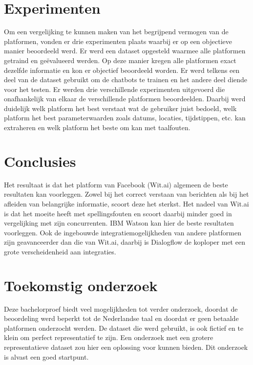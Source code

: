 \documentclass[a0,portrait]{a0poster}
\begin{document}
\begin{multicols}{2}
\color{Black} %
\color{HoGentAccent1} 
\section*{Experimenten}
\color{black}
Om een vergelijking te kunnen maken van het begrijpend vermogen van de platformen,
vonden er drie experimenten plaats waarbij er op een objectieve manier beoordeeld
werd. Er werd een dataset opgesteld waarmee alle platformen getraind en
geëvalueerd werden. Op deze manier kregen alle platformen exact dezelfde informatie
en kon er objectief beoordeeld worden. Er werd telkens een deel van de dataset gebruikt
om de chatbots te trainen en het andere deel diende voor het testen. Er werden drie verschillende experimenten uitgevoerd die onafhankelijk van elkaar de verschillende platformen beoordeelden. Daarbij werd duidelijk welk platform het best verstaat wat de gebruiker juist bedoeld, welk platform het best parameterwaarden zoals datums, locaties, tijdstippen, etc. kan extraheren en welk platform het beste om kan met taalfouten.




\color{HoGentAccent1} 
\section*{Conclusies}
\color{black}
Het resultaat is dat het platform van Facebook (Wit.ai) algemeen de beste resultaten kan
voorleggen. Zowel bij het correct verstaan van berichten als bij het afleiden van belangrijke
informatie, scoort deze het sterkst. Het nadeel van Wit.ai is dat het moeite heeft met
spellingsfouten en scoort daarbij minder goed in vergelijking met zijn concurrenten. IBM
Watson kan hier de beste resultaten voorleggen. Ook de ingebouwde integratiemogelijkheden
van andere platformen zijn geavanceerder dan die van Wit.ai, daarbij is Dialogflow de
koploper met een grote verscheidenheid aan integraties.
\color{HoGentAccent1} 
\section*{Toekomstig onderzoek}
\color{black}
Deze bachelorproef biedt veel mogelijkheden tot verder onderzoek, doordat de beoordeling
werd beperkt tot de Nederlandse taal en doordat er geen betaalde platformen onderzocht
werden. De dataset die werd gebruikt, is ook fictief en te klein om perfect representatief te
zijn. Een onderzoek met een grotere representatieve dataset zou hier een oplossing voor
kunnen bieden. Dit onderzoek is alvast een goed startpunt.



\end{multicols}
\end{document}
